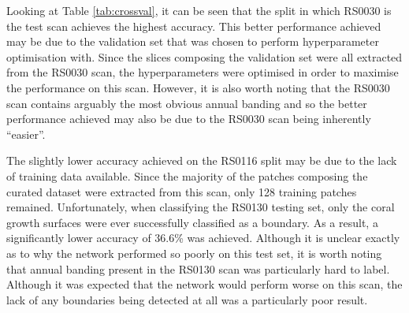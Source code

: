 Looking at Table \ref{tab:crossval}, it can be seen that the split in which RS0030 is the test scan achieves the highest accuracy. This better performance achieved may be due to the validation set that was chosen to perform hyperparameter optimisation with. Since the slices composing the validation set were all extracted from the RS0030 scan, the hyperparameters were optimised in order to maximise the performance on this scan. However, it is also worth noting that the RS0030 scan contains arguably the most obvious annual banding and so the better performance achieved may also be due to the RS0030 scan being inherently ``easier''.

The slightly lower accuracy achieved on the RS0116 split may be due to the lack of training data available. Since the majority of the patches composing the curated dataset were extracted from this scan, only 128 training patches remained. Unfortunately, when classifying the RS0130 testing set, only the coral growth surfaces were ever successfully classified as a boundary. As a result, a significantly lower accuracy of 36.6\% was achieved. Although it is unclear exactly as to why the network performed so poorly on this test set, it is worth noting that annual banding present in the RS0130 scan was particularly hard to label. Although it was expected that the network would perform worse on this scan, the lack of any boundaries being detected at all was a particularly poor result.

